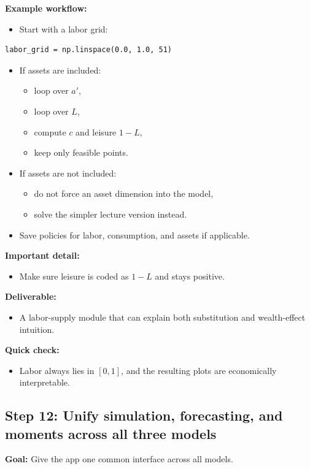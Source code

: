 \documentclass[11pt]{article}
\begin{document}
\textbf{Example workflow:}
\begin{itemize}
    \item Start with a labor grid:
\end{itemize}
\begin{lstlisting}
labor_grid = np.linspace(0.0, 1.0, 51)
\end{lstlisting}
\begin{itemize}
    \item If assets are included:
    \begin{itemize}
        \item loop over \(a'\),
        \item loop over \(L\),
        \item compute \(c\) and leisure \(1-L\),
        \item keep only feasible points.
    \end{itemize}
    \item If assets are not included:
    \begin{itemize}
        \item do not force an asset dimension into the model,
        \item solve the simpler lecture version instead.
    \end{itemize}
    \item Save policies for labor, consumption, and assets if applicable.
\end{itemize}

\textbf{Important detail:}
\begin{itemize}
    \item Make sure leisure is coded as \(1-L\) and stays positive.
\end{itemize}

\textbf{Deliverable:}
\begin{itemize}
    \item A labor-supply module that can explain both substitution and wealth-effect intuition.
\end{itemize}

\textbf{Quick check:}
\begin{itemize}
    \item Labor always lies in \([0,1]\), and the resulting plots are economically interpretable.
\end{itemize}

\subsection{Step 12: Unify simulation, forecasting, and moments across all three models}
\textbf{Goal:} Give the app one common interface across all models.
\end{document}
